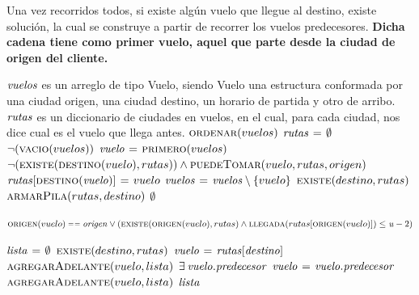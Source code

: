 Una vez recorridos todos, si existe algún vuelo que llegue al destino, existe
solución, la cual se construye a partir de recorrer los vuelos predecesores.
\textbf{Dicha cadena tiene como primer vuelo, aquel que parte desde la ciudad
de origen del cliente.}


\begin{codebox}
\li \Comment $\id{vuelos}$ es un arreglo de tipo Vuelo, siendo Vuelo una
\li \Comment estructura conformada por una ciudad origen, una ciudad destino,
\li \Comment un horario de partida y otro de arribo.
\li
\li \Comment $\id{rutas}$ es un diccionario de ciudades en vuelos, en el cual,
\li \Comment para cada ciudad, nos dice cual es el vuelo que llega antes.
\li $\textnormal{\scshape ordenar}(vuelos)$
\li $\id{rutas} \gets \emptyset$
\li \While $\neg (\textnormal{\scshape vacio}(vuelos))$
\li     \Do
            $\id{vuelo} \gets \proc{primero}(vuelos)$
\li         \If $\neg (\textnormal{\scshape existe}(\textnormal{\scshape destino}(vuelo),rutas)) \land
                \textnormal{\scshape puedeTomar}(vuelo,rutas,origen)$
\li             \Then
                    $\id{rutas[\proc{destino}(vuelo)]} \gets vuelo$
                \End
\li         $\id{vuelos} \gets \id{vuelos} \setminus \{vuelo\}$
        \End
\li \If $\textnormal{\scshape existe}(destino,rutas)$
\li     \Then
            \Return $\textnormal{\scshape armarPila}(rutas,destino)$
\li     \Else
\li         \Return $\emptyset$
        \End
\end{codebox}


\vspace*{0.3cm}


\begin{codebox}
\li \Return $\proc{origen}(vuelo) \isequal \id{origen} \lor
            (\proc{existe}(\proc{origen}(vuelo),rutas) \land
             \proc{llegada}(rutas[\proc{origen}(vuelo)]) \leq
             \id{u} - 2)$
\end{codebox}


\vspace*{0.3cm}


\begin{codebox}
\li $\id{lista} \gets \emptyset$
\li \If $\textnormal{\scshape existe}(destino,rutas)$
\li     \Then
            $\id{vuelo} \gets \id{rutas[destino]}$
\li         $\textnormal{\scshape agregarAdelante}(vuelo,lista)$
\li         \While $\exists \hspace{0.07cm} \id{vuelo.predecesor}$
\li             \Do
                   $\id{vuelo} \gets \id{vuelo.predecesor}$
\li                $\textnormal{\scshape agregarAdelante}(vuelo,lista)$
                \End
\li     \Else
\li         \Return $\id{lista}$
        \End
\end{codebox}



